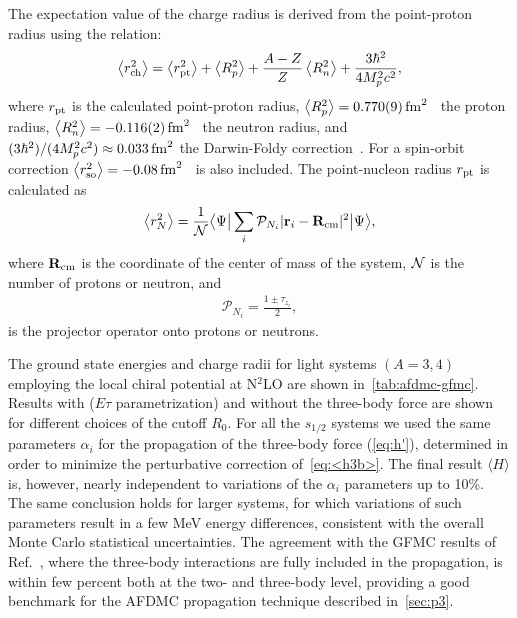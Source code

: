 \documentclass[aps,prc,twocolumn,superscriptaddress,showpacs,floatfix,nofootinbib]{revtex4-1}
\begin{document}
The expectation value of the charge radius is derived from the point-proton radius using the relation:
\begin{align}
	\left\langle r_{\rm ch}^2\right\rangle=
	\left\langle r_{\rm pt}^2\right\rangle+
	\left\langle R_p^2\right\rangle+
	\frac{A-Z}{Z}\left\langle R_n^2\right\rangle+
	\frac{3\hbar^2}{4M_p^2c^2},
	\label{eq:rch}
\end{align}
where $r_{\rm pt}$ is the calculated point-proton radius,
$\left\langle R_p^2\right\rangle=0.770(9)\,\rm{fm}^2$~\cite{Beringer:2012} the proton radius, 
$\left\langle R_n^2\right\rangle=-0.116(2)\,\rm{fm}^2$~\cite{Beringer:2012} the neutron radius,
and $(3\hbar^2)/(4M_p^2c^2)\approx0.033\,\rm{fm}^2$ the Darwin-Foldy correction~\cite{Friar:1997}.
For  a spin-orbit correction 
$\left\langle r_{\rm so}^2\right\rangle=-0.08\,\rm{fm}^2$~\cite{Ong:2010} is also included.
The point-nucleon radius $r_{\rm pt}$ is calculated as
\begin{align}
	\left\langle r_N^2\right\rangle=\frac{1}{{\cal N}}\big\langle\Psi\big|\sum_i\mathcal P_{N_i} |\vb{r}_i-\vb{R}_{\rm cm}|^2\big|\Psi\big\rangle,
\end{align}
where $\vb{R}_{\rm cm}$ is the coordinate of the center of mass of the system,
${\cal N}$ is the number of protons or neutron, and 
\begin{align}
	\mathcal P_{N_i}=\frac{1\pm\tau_{z_i}}{2},
	\label{eq:proj}
\end{align}
is the projector operator onto protons or neutrons.

The ground state energies and charge radii for light systems $(A=3,4)$ employing 
the local chiral potential at N$^2$LO are shown in~\cref{tab:afdmc-gfmc}. 
Results with ($E\tau$ parametrization) and without the three-body force are shown 
for different choices of the cutoff $R_0$. For all the $s_{1/2}$ systems we used the same 
parameters $\alpha_i$ for the propagation of the three-body force (\cref{eq:h'}), 
determined in order to minimize the perturbative correction of~\cref{eq:<h3b>}.
The final result $\langle H\rangle$ is, however, nearly independent to variations
of the $\alpha_i$ parameters up to 10\%. The same conclusion holds for larger
systems, for which variations of such parameters result in a few MeV energy 
differences, consistent with the overall Monte Carlo statistical uncertainties. 
The agreement with the GFMC results of Ref.~\cite{Lynn:2016,Lynn:2017},
where the three-body interactions are fully included in the propagation, 
is within few percent both at the two- and three-body level, providing a good
benchmark for the AFDMC propagation technique described in~\cref{sec:p3}.
\end{document}
